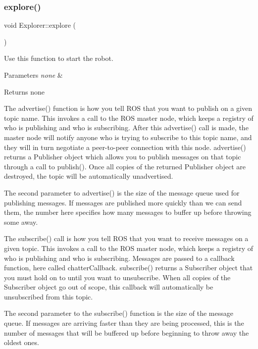 \subsubsection{\texorpdfstring{explore()}{explore()}}
{\footnotesize\ttfamily void Explorer\+::explore (\begin{DoxyParamCaption}{ }\end{DoxyParamCaption})}



Use this function to start the robot. 


\begin{DoxyParams}{Parameters}
{\em none} & \\
\hline
\end{DoxyParams}
\begin{DoxyReturn}{Returns}
none 
\end{DoxyReturn}
The advertise() function is how you tell R\+OS that you want to publish on a given topic name. This invokes a call to the R\+OS master node, which keeps a registry of who is publishing and who is subscribing. After this advertise() call is made, the master node will notify anyone who is trying to subscribe to this topic name, and they will in turn negotiate a peer-\/to-\/peer connection with this node. advertise() returns a Publisher object which allows you to publish messages on that topic through a call to publish(). Once all copies of the returned Publisher object are destroyed, the topic will be automatically unadvertised.

The second parameter to advertise() is the size of the message queue used for publishing messages. If messages are published more quickly than we can send them, the number here specifies how many messages to buffer up before throwing some away.

The subscribe() call is how you tell R\+OS that you want to receive messages on a given topic. This invokes a call to the R\+OS master node, which keeps a registry of who is publishing and who is subscribing. Messages are passed to a callback function, here called chatter\+Callback. subscribe() returns a Subscriber object that you must hold on to until you want to unsubscribe. When all copies of the Subscriber object go out of scope, this callback will automatically be unsubscribed from this topic.

The second parameter to the subscribe() function is the size of the message queue. If messages are arriving faster than they are being processed, this is the number of messages that will be buffered up before beginning to throw away the oldest ones.

